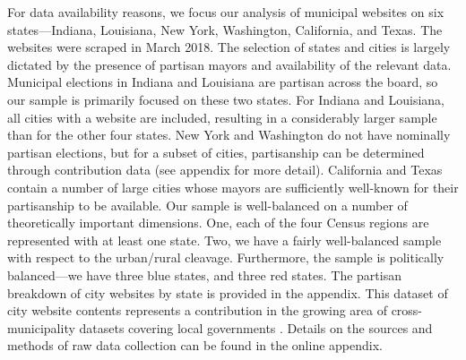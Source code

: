 \documentclass[11pt]{article}
\begin{document}
For data availability reasons, we focus our analysis of municipal websites on six states---Indiana, Louisiana, New York, Washington, California, and Texas. The websites were scraped in March 2018. The selection of states and cities is largely dictated by the presence of partisan mayors and availability of the relevant data. Municipal elections in Indiana and Louisiana are partisan across the board, so our sample is primarily focused on these two states. For Indiana and Louisiana, all cities with a website are included, resulting in a considerably larger sample than for the other four states. New York and Washington do not have nominally partisan elections, but for a subset of cities, partisanship can be determined through contribution data (see appendix for more detail). California and Texas contain a number of large cities whose mayors are sufficiently well-known for their partisanship to be available. Our sample is well-balanced on a number of theoretically important dimensions. One, each of the four Census regions are represented with at least one state. Two, we have a fairly well-balanced sample with respect to the urban/rural cleavage. Furthermore, the sample is politically balanced---we have three blue states, and three red states.  The partisan breakdown of city websites by state is provided in the appendix. This dataset of city website contents represents a contribution in the growing area of cross-municipality datasets covering local governments \citep[e.g., ][]{marschall2013local,sumner2020crowdsourcing}. Details on the sources and methods of raw data collection can be found in the online appendix.


\vspace{-.2cm}
\end{document}
